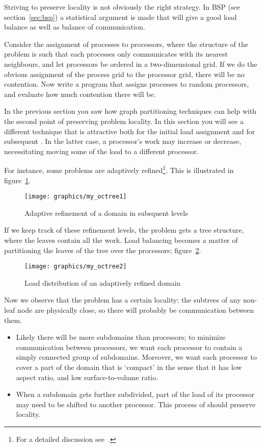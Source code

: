 Striving to preserve locality is not obviously the right strategy. In
\ac{BSP} (see section~\ref{sec:bsp}) a statistical argument is made
that  will give a good load balance as
well as balance of communication.

\begin{exercise}
  Consider the assignment of processes to processors, where the
  structure of the problem is such that 
  each processes only communicates with its
  nearest neighbours, and let processors be ordered in a
  two-dimensional grid. If we do the obvious assignment of the process
  grid to the processor grid, there will be no contention. Now write a
  program that assigns processes to random processors, and evaluate
  how much contention there will be.
\end{exercise}

In the previous section you saw how graph partitioning techniques can
help with the second point of preserving problem locality. In this
section you will see a different technique that is attractive both for
the initial load assignment and for subsequent
. In the latter case, a processor's
work may increase or decrease, necessitating moving some of the load
to a different processor.

For instance, some problems are adaptively
refined\footnote{For a detailed
  discussion see~\cite{Campbell:octree}.}. This is illustrated in
figure~\ref{fig:octree1}.
\begin{figure}[ht]
  \texttt{[image: graphics/my\_octree1]}
  \caption{Adaptive refinement of a domain in subsquent levels}
  \label{fig:octree1}
\end{figure}
If we keep track of these refinement levels, the problem gets a tree
structure, where the leaves contain all the work.
Load balancing becomes a matter of partitioning the leaves of the
tree over the processors; figure~\ref{fig:octree2}.
\begin{figure}[ht]
  \texttt{[image: graphics/my\_octree2]}
  \caption{Load distribution of an adaptively refined domain}
  \label{fig:octree2}
\end{figure}
Now we observe that the problem has a certain locality: the subtrees
of any non-leaf node are physically close, so there will probably be
communication between them. 
\begin{itemize}
\item Likely there will be more subdomains than processors; to
  minimize communication between processors, we want each processor to
  contain a simply connected group of subdomains. Moreover, we want
  each processor to cover a part of the domain that is `compact' in
  the sense that it has low aspect ratio, and low surface-to-volume
  ratio.
\item When a subdomain gets further subdivided, part of the load of
  its processor may need to be shifted to another processor. This
  process of  should preserve
  locality.
\end{itemize}

